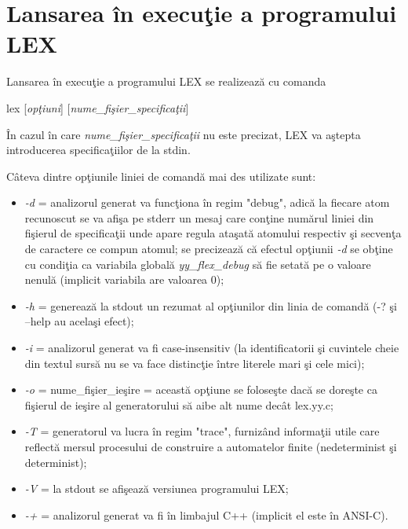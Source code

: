 \section{Lansarea \^{i}n execu\c{t}ie a programului LEX}

Lansarea \^{i}n execu\c{t}ie a programului LEX se realizeaz\u{a} cu comanda
\begin{center}
lex [\emph{op\c{t}iuni}] [\emph{nume\_fi\c{s}ier\_specifica\c{t}ii}]
\end{center}
\^{I}n cazul \^{i}n care \emph{nume\_fi\c{s}ier\_specifica\c{t}ii} nu este precizat, LEX va a\c{s}tepta introducerea specifica\c{t}iilor de la stdin. 

C\^{a}teva dintre op\c{t}iunile liniei de comand\u{a} mai des utilizate sunt:
\begin{itemize}
	\item \emph{-d} = analizorul generat va func\c{t}iona \^{i}n regim "debug", adic\u{a} la fiecare atom recunoscut se va afi\c{s}a pe stderr un mesaj care con\c{t}ine num\u{a}rul liniei din fi\c{s}ierul de specifica\c{t}ii unde apare regula ata\c{s}at\u{a} atomului respectiv \c{s}i secven\c{t}a de caractere ce compun atomul; se precizeaz\u{a} c\u{a} efectul op\c{t}iunii \emph{-d} se ob\c{t}ine cu condi\c{t}ia ca variabila global\u{a} \emph{yy\_flex\_debug} s\u{a} fie setat\u{a} pe o valoare nenul\u{a}  (implicit variabila are valoarea 0);
	\item \emph{-h} = genereaz\u{a} la stdout un rezumat al op\c{t}iunilor din linia de comand\u{a} (-? \c{s}i --help au acela\c{s}i efect);
	\item \emph{-i} = analizorul generat va fi case-insensitiv (la identificatorii \c{s}i cuvintele cheie din textul surs\u{a} nu se va face distinc\c{t}ie \^{i}ntre literele mari \c{s}i cele mici);
	\item \emph{-o} = nume\_fi\c{s}ier\_ie\c{s}ire = aceast\u{a} op\c{t}iune se folose\c{s}te dac\u{a} se dore\c{s}te ca fi\c{s}ierul de ie\c{s}ire al generatorului s\u{a} aibe alt nume dec\^{a}t lex.yy.c;
	\item \emph{-T} = generatorul va lucra \^{i}n regim "trace", furniz\^{a}nd informa\c{t}ii utile care reflect\u{a} mersul procesului de construire a automatelor finite (nedeterminist \c{s}i determinist);
	\item \emph{-V} = la stdout se afi\c{s}eaz\u{a} versiunea programului LEX;
	\item \emph{-+} = analizorul generat va fi \^{i}n limbajul C++ (implicit el este \^{i}n ANSI-C).
\end{itemize}

